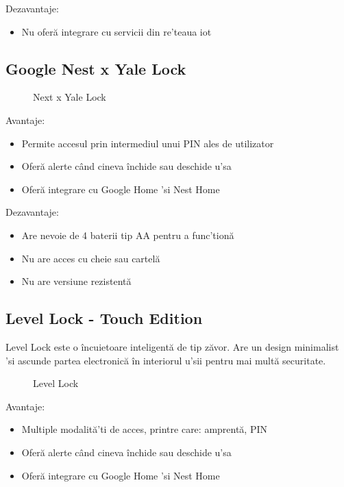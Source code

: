 Dezavantaje:

\begin{itemize}
  \item Nu oferă integrare cu servicii din re'teaua \acrshort{iot}
\end{itemize}

\subsection {Google Nest x Yale Lock}

\begin{figure}[h!]
  \centering
  \caption{Next x Yale Lock \cite{YaleLock}}
\end{figure}

Avantaje:
\begin{itemize}
  \item Permite accesul prin intermediul unui PIN ales de utilizator
  \item Oferă alerte când cineva închide sau deschide u'sa
  \item Oferă integrare cu Google Home 'si Nest Home
\end{itemize}

Dezavantaje:
\begin{itemize}
  \item Are nevoie de 4 baterii tip AA pentru a func'tionă
  \item Nu are acces cu cheie sau cartelă
  \item Nu are versiune rezistentă
\end{itemize}


\subsection {Level Lock - Touch Edition}

Level Lock este o încuietoare inteligentă de tip zăvor. Are un design minimalist 'si ascunde partea electronică în interiorul u'sii pentru mai multă securitate.

\begin{figure}[h!]
  \centering
  \caption{Level Lock \cite{LevelLock}}
\end{figure}

Avantaje:
\begin{itemize}
  \item Multiple modalită'ti de acces, printre care: amprentă, PIN
  \item Oferă alerte când cineva închide sau deschide u'sa
  \item Oferă integrare cu Google Home 'si Nest Home
\end{itemize}


